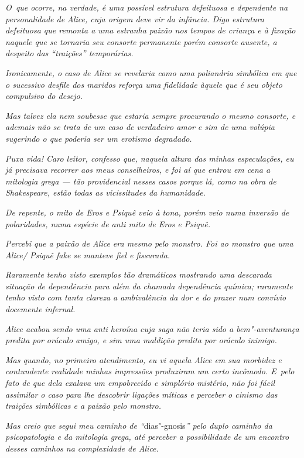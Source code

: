 \emph{O~que ocorre, na verdade, é uma possível estrutura defeituosa e
dependente na personalidade de Alice, cuja origem deve vir da infância.
Digo estrutura defeituosa que remonta a uma estranha paixão nos tempos
de criança e à fixação naquele que se tornaria seu consorte permanente
porém consorte ausente, a despeito das ``traições'' temporárias.}~

\emph{Ironicamente, o caso de Alice se revelaria como uma poliandria
simbólica em que o sucessivo desfile dos maridos reforça uma fidelidade
àquele que é seu objeto compulsivo do desejo.}~

\emph{Mas talvez ela nem soubesse que estaria sempre procurando o mesmo
consorte, e ademais não se trata de um caso de verdadeiro amor e sim de
uma volúpia sugerindo o que poderia ser um erotismo degradado.}~

\emph{Puxa vida! Caro leitor, confesso que, naquela altura das minhas
especulações, eu já precisava recorrer aos meus conselheiros, e foi aí
que entrou em cena a mitologia grega --- tão providencial nesses casos
porque lá, como na obra de Shakespeare, estão todas as vicissitudes da
humanidade.}~

\emph{De repente, o mito de Eros e Psiquê veio à tona, porém veio numa
inversão de polaridades, numa espécie de anti mito de Eros e Psiquê.}~

\emph{Percebi que a paixão de Alice era mesmo pelo monstro. Foi ao
monstro que uma Alice/ Psiquê fake se manteve fiel e fissurada.}~

\emph{Raramente tenho visto exemplos tão dramáticos mostrando uma
descarada situação de dependência para além da chamada dependência
química; raramente tenho visto com tanta clareza a ambivalência da dor e
do prazer num convívio docemente infernal.}~

\emph{Alice acabou sendo uma anti heroína cuja saga não teria sido a
bem"-aventurança predita por oráculo amigo, e sim uma maldição predita
por oráculo inimigo.}~

\emph{Mas quando, no primeiro atendimento, eu vi aquela Alice em sua
morbidez e contundente realidade minhas impressões produziram um certo
incômodo. E~pelo fato de que dela exalava um empobrecido e simplório
mistério, não foi fácil assimilar o caso para lhe descobrir ligações
míticas e perceber o cinismo das traições simbólicas e a paixão pelo
monstro.}~

\emph{Mas creio que segui meu caminho de ``}dias"-gnosis\emph{'' pelo
duplo caminho da psicopatologia e da mitologia grega, até perceber a
possibilidade de um encontro desses caminhos na complexidade de Alice.}~

